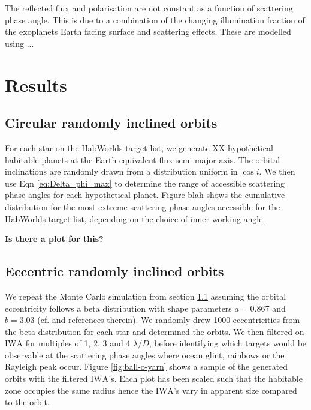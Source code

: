 \documentclass[
    usenatbib,
]{mnras}
\newcommand{\IWA}{\ensuremath{\mathrm{IWA}}}
\begin{document}
The reflected flux and polarisation are not constant as a function of scattering phase angle. This is due to a combination of the changing illumination fraction of the exoplanets Earth facing surface and scattering effects. These are modelled using ...

\section{Results}

\subsection{Circular randomly inclined orbits}
\label{sec:circular}
For each star on the HabWorlds target list, we generate XX hypothetical habitable planets at the Earth-equivalent-flux semi-major axis. The orbital inclinations are randomly drawn from a distribution uniform in $\cos i$. We then use Eqn \ref{eq:Delta_phi_max} to determine the range of accessible scattering phase angles for each hypothetical planet. Figure blah shows the cumulative distribution for the most extreme scattering phase angles accessible for the HabWorlds target list, depending on the choice of inner working angle.  

\textbf{Is there a plot for this?}

\subsection{Eccentric randomly inclined orbits}
\label{sec:eccentric}
We repeat the Monte Carlo simulation from section \ref{sec:circular} assuming the orbital eccentricity follows a beta distribution with shape parameters $a=0.867$ and $b=3.03$ (cf. \citet{Guimond_2019} and references therein). We randomly drew 1000 eccentricities from the beta distribution for each star and determined the orbits. We then filtered on $\IWA$ for multiples of 1, 2, 3 and 4 $\lambda / D$, before identifying which targets would be observable at the scattering phase angles where ocean glint, rainbows or the Rayleigh peak occur. Figure \ref{fig:ball-o-yarn} shows a sample of the generated orbits with the filtered \IWA's. Each plot has been scaled such that the habitable zone occupies the same radius hence the \IWA's vary in apparent size compared to the orbit. 
\end{document}
